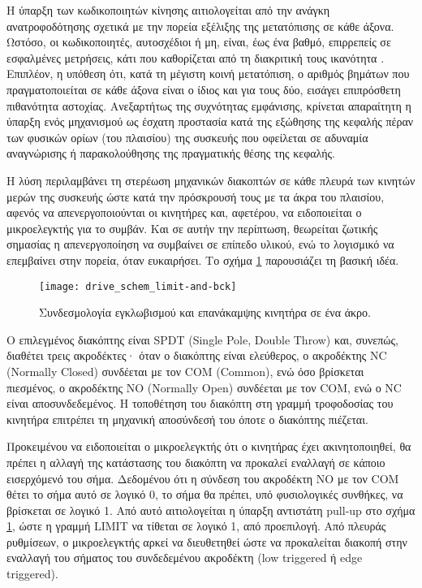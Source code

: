 Η ύπαρξη των κωδικοποιητών κίνησης αιτιολογείται από την ανάγκη ανατροφοδότησης
σχετικά με την πορεία εξέλιξης της μετατόπισης σε κάθε άξονα. Ωστόσο, οι
κωδικοποιητές, αυτοσχέδιοι ή μη, είναι, έως ένα βαθμό, επιρρεπείς σε εσφαλμένες
μετρήσεις, κάτι που καθορίζεται από τη διακριτική τους ικανότητα
\parencite[15--16]{albert11}. Επιπλέον, η υπόθεση ότι, κατά τη μέγιστη κοινή
μετατόπιση, ο αριθμός βημάτων που πραγματοποιείται σε κάθε άξονα είναι ο ίδιος
και για τους δύο, εισάγει επιπρόσθετη πιθανότητα αστοχίας. Ανεξαρτήτως της
συχνότητας εμφάνισης, κρίνεται απαραίτητη η ύπαρξη ενός μηχανισμού ως έσχατη
προστασία κατά της εξώθησης της κεφαλής πέραν των φυσικών ορίων (του πλαισίου)
της συσκευής που οφείλεται σε αδυναμία αναγνώρισης ή παρακολούθησης της
πραγματικής θέσης της κεφαλής.

Η λύση περιλαμβάνει τη στερέωση μηχανικών διακοπτών σε κάθε πλευρά των κινητών
μερών της συσκευής ώστε κατά την πρόσκρουσή τους με τα άκρα του πλαισίου, αφενός
να απενεργοποιούνται οι κινητήρες και, αφετέρου, να ειδοποιείται ο μικροελεγκτής
για το συμβάν. Και σε αυτήν την περίπτωση, θεωρείται ζωτικής σημασίας η
απενεργοποίηση να συμβαίνει σε επίπεδο υλικού, ενώ το λογισμικό να επεμβαίνει
στην πορεία, όταν ευκαιρήσει. Το σχήμα \ref{fig:motor:limit_switch} παρουσιάζει
τη βασική ιδέα.

\begin{figure}
    \caption{Συνδεσμολογία εγκλωβισμού και επανάκαμψης κινητήρα σε ένα άκρο.
    \label{fig:motor:limit_switch}}
    \begin{center}
    \texttt{[image: drive\_schem\_limit-and-bck]}
    \end{center}
\end{figure}

Ο επιλεγμένος διακόπτης είναι SPDT (\textenglish{Single Pole, Double Throw})
και, συνεπώς, διαθέτει τρεις ακροδέκτες· όταν ο διακόπτης είναι ελεύθερος, ο
ακροδέκτης NC (\textenglish{Normally Closed}) συνδέεται με τον COM
(\textenglish{Common}), ενώ όσο βρίσκεται πιεσμένος, ο ακροδέκτης NO
(\textenglish{Normally Open}) συνδέεται με τον COM, ενώ ο NC είναι
αποσυνδεδεμένος. Η τοποθέτηση του διακόπτη στη γραμμή τροφοδοσίας του κινητήρα
επιτρέπει τη μηχανική αποσύνδεσή του όποτε ο διακόπτης πιέζεται.

Προκειμένου να ειδοποιείται ο μικροελεγκτής ότι ο κινητήρας έχει ακινητοποιηθεί,
θα πρέπει η αλλαγή της κατάστασης του διακόπτη να προκαλεί εναλλαγή σε κάποιο
εισερχόμενό του σήμα. Δεδομένου ότι η σύνδεση του ακροδέκτη NO με τον COM θέτει
το σήμα αυτό σε λογικό 0, το σήμα θα πρέπει, υπό φυσιολογικές συνθήκες, να
βρίσκεται σε λογικό 1. Από αυτό αιτιολογείται η ύπαρξη αντιστάτη pull-up στο
σχήμα \ref{fig:motor:limit_switch}, ώστε η γραμμή LIMIT να τίθεται σε λογικό 1,
από προεπιλογή. Από πλευράς ρυθμίσεων, ο μικροελεγκτής αρκεί να διευθετηθεί ώστε
να προκαλείται διακοπή στην εναλλαγή του σήματος του συνδεδεμένου ακροδέκτη
(\textenglish{low triggered} ή \textenglish{edge triggered}).

